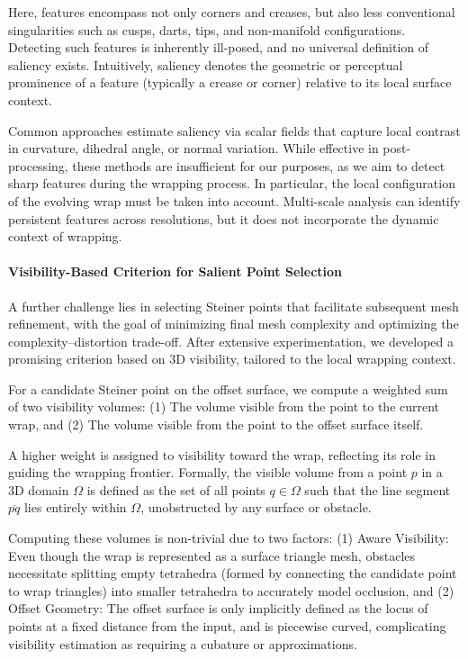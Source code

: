 Here, features encompass not only corners and creases, but also less conventional singularities such as cusps, darts, tips, and non-manifold configurations. Detecting such features is inherently ill-posed, and no universal definition of saliency exists. Intuitively, saliency denotes the geometric or perceptual prominence of a feature (typically a crease or corner) relative to its local surface context.

Common approaches estimate saliency via scalar fields that capture local contrast in curvature, dihedral angle, or normal variation. While effective in post-processing, these methods are insufficient for our purposes, as we aim to detect sharp features during the wrapping process. In particular, the local configuration of the evolving wrap must be taken into account. Multi-scale analysis can identify persistent features across resolutions, but it does not incorporate the dynamic context of wrapping.

\paragraph{Visibility-Based Criterion for Salient Point Selection}

A further challenge lies in selecting Steiner points that facilitate subsequent mesh refinement, with the goal of minimizing final mesh complexity and optimizing the complexity–distortion trade-off. After extensive experimentation, we developed a promising criterion based on 3D visibility, tailored to the local wrapping context.

For a candidate Steiner point on the offset surface, we compute a weighted sum of two visibility volumes: (1) The volume visible from the point to the current wrap, and (2) The volume visible from the point to the offset surface itself.


A higher weight is assigned to visibility toward the wrap, reflecting its role in guiding the wrapping frontier. Formally, the visible volume from a point $p$ in a 3D domain $\Omega$ is defined as the set of all points $q \in \Omega$ such that the line segment $\overline{pq}$ lies entirely within $\Omega$, unobstructed by any surface or obstacle.

Computing these volumes is non-trivial due to two factors: (1) Aware Visibility: Even though the wrap is represented as a surface triangle mesh, obstacles necessitate splitting empty tetrahedra (formed by connecting the candidate point to wrap triangles) into smaller tetrahedra to accurately model occlusion, and (2) Offset Geometry: The offset surface is only implicitly defined as the locus of points at a fixed distance from the input, and is piecewise curved, complicating visibility estimation as requiring a cubature or approximations.

